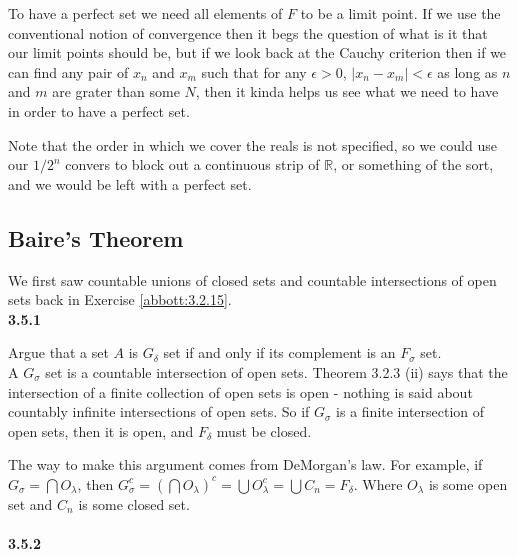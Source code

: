To have a perfect set we need all elements of $F$ to be a limit point.
If we use the conventional notion of convergence then it begs the question of what is it that our limit points should be,
but if we look back at the Cauchy criterion then if we can find any pair of
$x_n$ and $x_m$ such that for any $\epsilon > 0$, $|x_n - x_m| < \epsilon$ as long as
$n$ and $m$ are grater than some $N$, then it kinda helps us see what we need to have in order to have
a perfect set.

Note that the order in which we cover the reals is not specified, so we could use our $1/2^n$ convers
to block out a continuous strip of $\mathbb{R}$, or something of the sort, and we would be left with a perfect set.




\subsection{Baire's Theorem}
\label{abbott:baires-theorem}

We first saw countable unions of closed sets and countable intersections of open sets back in
Exercise \ref{abbott:3.2.15}.
\\

\label{abbott:3.5.1}
\textbf{3.5.1}

Argue that a set $A$ is $G_\delta$ set if and only if its complement is an $F_\sigma$ set.
\\

A $G_\sigma$ set is a countable intersection of open sets.
Theorem 3.2.3 (ii) says that the intersection of a finite collection of open sets is open
- nothing is said about countably infinite intersections of open sets.
So if $G_\sigma$ is a finite intersection of open sets, then it is open, and $F_\delta$ must be closed.

The way to make this argument comes from DeMorgan's law.
For example, if $G_\sigma = \bigcap O_\lambda$, then
$G_{\sigma}^{c} = \left( \bigcap O_\lambda \right)^c = \bigcup O_{\lambda}^{c} = \bigcup C_n = F_\delta$.
Where $O_\lambda$ is some open set and $C_n$ is some closed set.
\\~\\


\label{abbott:3.5.2}
\textbf{3.5.2}

